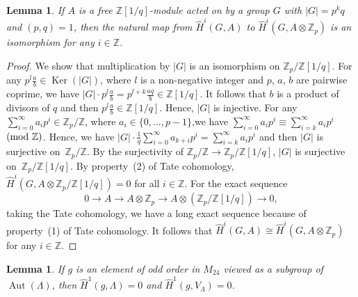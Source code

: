 \documentclass[10pt,a4paper]{amsart}
\numberwithin{equation}{section}
\newtheorem{Lemma}[Theorem]{Lemma}
\begin{document}
\begin{Lemma}\label{Zpkai}
If $A$ is a free $\mathbb{Z}[1/q]$-module acted on by a group $G$ with $|G|=p^kq $ and $(p,q)=1$, then the natural map from $\hat{H}^i(G,A)$ to $\hat{H}^i(G,A\otimes \mathbb{Z}_p)$ is an isomorphism for any $i\in \mathbb{Z}$.
\end{Lemma}

\begin{proof}
We show that multiplication by $|G|$ is an isomorphism on $\mathbb{Z}_p/\mathbb{Z}[1/q]$. For any $p^l\frac{a}{b} \in \operatorname{Ker}(|G|)$, where $l$ is a non-negative integer and $p$, $a$, $b$ are pairwise coprime, we have $|G|\cdot p^l\frac{a}{b}=p^{l+k}\frac{aq}{b} \in \mathbb{Z}[1/q]$. It follows that $b$ is a product of divisors of $q$ and then $p^l\frac{a}{b} \in \mathbb{Z}[1/q]$. Hence, $|G|$ is injective. For any $\sum_{i=0}^\infty a_ip^i \in \mathbb{Z}_p/\mathbb{Z}$, where $a_i \in \{0,\dots ,p-1\}$,we have $\sum_{i=0}^\infty a_ip^i \equiv \sum_{i=k}^\infty a_ip^i$ $({\rm mod}\ \mathbb{Z})$. Hence, we have $|G|\cdot \frac{1}{q}\sum_{i=0}^\infty a_{k+i}p^i=\sum_{i=k}^\infty a_ip^i$ and then $|G|$ is surjective on~$\mathbb{Z}_p/\mathbb{Z}$. By the surjectivity of $\mathbb{Z}_p/\mathbb{Z}\rightarrow \mathbb{Z}_p/\mathbb{Z}[1/q]$, $|G|$ is surjective on~$\mathbb{Z}_p/\mathbb{Z}[1/q]$. By property~(2) of Tate cohomology, $\hat{H}^i(G,A\otimes \mathbb{Z}_p/\mathbb{Z}[1/q])=0$ for all $i\in \mathbb{Z}$. For the exact sequence
\[
0\rightarrow A\rightarrow A\otimes \mathbb{Z}_p\rightarrow A\otimes (\mathbb{Z}_p/\mathbb{Z}[1/q])\rightarrow 0,
\]
 taking the Tate cohomology, we have a long exact sequence because of property~(1) of Tate cohomology. It follows that $\hat{H}^i(G,A)\cong \hat{H}^i(G,A\otimes \mathbb{Z}_p)$ for any $i\in \mathbb{Z}$.
\end{proof}

\begin{Lemma}\label{lattice15A}
If $g$ is an element of odd order in $M_{24}$ viewed as a subgroup of $\operatorname{Aut}(\Lambda)$, then $\hat{H}^1(g,\Lambda)=0$ and $\hat{H}^1(g,V_\Lambda)=0$.
\end{Lemma}
\end{document}
